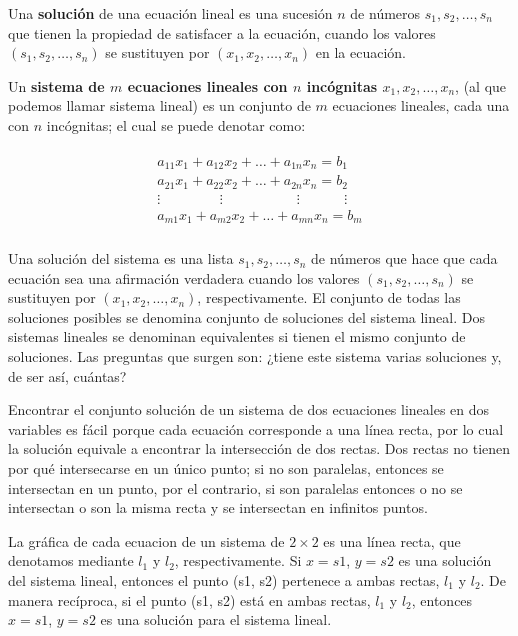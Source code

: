 \documentclass{article}
\begin{document}
Una \textbf{solución} de una ecuación lineal es una sucesión $ n $ de números $ s_1,s_2,\dots, s_n $ que tienen la propiedad de satisfacer a la ecuación, cuando los valores $(s_1, s_2, \dots, s_n)$ se sustituyen por $(x_1, x_2, \dots, x_n)$ en la ecuación.

Un \textbf{sistema de $m$ ecuaciones lineales con $n$ incógnitas $ x_1,x_2,\dots, x_n $}, (al que podemos llamar sistema lineal) es un conjunto de $m$ ecuaciones lineales, cada una con $ n $ incógnitas; el cual se puede denotar como:

\begin{equation}
    \begin{matrix}
        \begin{aligned}
            a_{11}x_1 + a_{12}x_2 + \dots + a_{1n}x_n = b_1\\
            a_{21}x_1 + a_{22}x_2 + \dots + a_{2n}x_n = b_2\\
            \vdots \phantom{aaaaaaaa} \vdots \phantom{aaaaaaaaaa} \vdots \phantom{aaaaaa} \vdots\\
            a_{m1}x_1 + a_{m2}x_2 + \dots + a_{mn}x_n = b_m\\
        \end{aligned}
    \end{matrix}
\end{equation}

\pagebreak

Una solución del sistema es una lista $s_1, s_2, \dots, s_n$ de números que hace que cada ecuación sea una afirmación verdadera cuando los valores $(s_1, s_2, \dots, s_n)$ se sustituyen por $(x_1, x_2, \dots, x_n)$, respectivamente. El conjunto de todas las soluciones posibles se denomina conjunto de soluciones del sistema lineal. Dos sistemas lineales se denominan equivalentes si tienen el mismo conjunto de soluciones. Las preguntas que surgen son: ¿tiene este sistema varias soluciones y, de ser así, cuántas? 

Encontrar el conjunto solución de un sistema de dos ecuaciones lineales en dos variables es fácil porque cada ecuación corresponde a una línea recta, por lo cual la solución equivale a encontrar la intersección de dos rectas. Dos rectas no tienen por qué intersecarse en un único punto; si no son paralelas, entonces se intersectan en un punto, por el contrario, si son paralelas entonces o no se intersectan o son la misma recta y se intersectan en infinitos puntos.

La gráfica de cada ecuacion de un sistema de $2 \times 2$ es una línea recta, que denotamos mediante $l_1$ y $l_2$, respectivamente. Si $x = s1$, $y = s2$ es una solución del sistema lineal, entonces el punto (s1, s2) pertenece a ambas rectas, $l_1$ y $l_2$. De manera recíproca, si el punto (s1, s2) está en ambas rectas, $l_1$ y $l_2$, entonces $x = s1$, $y = s2$ es una solución para el sistema lineal.
\end{document}
